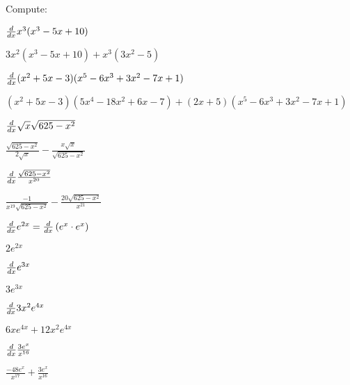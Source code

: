 \begin{exercises}

\noindent Compute:

\twocol

\begin{exercise} $\frac{d}{dx} x^3(x^3-5x+10)$
\begin{answer} $3x^2(x^3-5x+10)+x^3(3x^2-5)$
\end{answer}\end{exercise}

\begin{exercise} $\frac{d}{dx} (x^2+5x-3)(x^5-6x^3+3x^2-7x+1)$
\begin{answer} $(x^2+5x-3)(5x^4-18x^2+6x-7)+(2x+5)(x^5-6x^3+3x^2-7x+1)$
\end{answer}\end{exercise}

\begin{exercise} $\frac{d}{dx} \sqrt{x}\sqrt{625-x^2}$
\begin{answer} $\frac{\sqrt{625-x^2}}{2\sqrt{x}}-\frac{x\sqrt{x}}{\sqrt{625-x^2}}$
\end{answer}\end{exercise}

\begin{exercise} $\frac{d}{dx}\frac{\sqrt{625-x^2}}{x^{20}}$
\begin{answer} $\frac{-1}{x^{19}\sqrt{625-x^2}}-\frac{20\sqrt{625-x^2}}{x^{21}}$
\end{answer}\end{exercise}

\begin{exercise} $\frac{d}{dx} e^{2x} = \frac{d}{dx} \left(e^x \cdot e^x\right)$
\begin{answer}
$2e^{2x}$
\end{answer}
\end{exercise}

\begin{exercise} $\frac{d}{dx} e^{3x}$
\begin{answer} $3e^{3x}$
\end{answer}\end{exercise}


\begin{exercise} $\frac{d}{dx} 3x^2e^{4x}$
\begin{answer} $6xe^{4x}+12x^2e^{4x}$
\end{answer}\end{exercise}


\begin{exercise} $\frac{d}{dx} \frac{3e^x}{x^{16}}$
\begin{answer} $\frac{-48e^x}{x^{17}}+\frac{3e^x}{x^{16}}$
\end{answer}\end{exercise}



\end{exercises}

